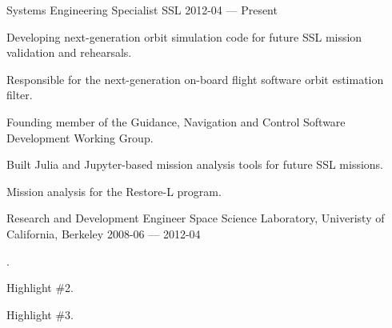 


\begin{cventries}

  \cventry
    {Systems Engineering Specialist} %
    {SSL} %
    {} %
    {2012-04 — Present} %
    {
      \begin{cvitems} %
        \item {Developing next-generation orbit simulation code for future SSL mission validation and rehearsals.}
        \item {Responsible for the next-generation on-board flight software orbit estimation filter.}
        \item {Founding member of the Guidance, Navigation and Control Software Development Working Group.}
        \item {Built Julia and Jupyter-based mission analysis tools for future SSL missions.}
        \item {Mission analysis for the Restore-L program.}
      \end{cvitems}
    }


  \cventry
    {Research and Development Engineer} %
    {Space Science Laboratory, Univeristy of California, Berkeley} %
    {} %
    {2008-06 — 2012-04} %
    {
      \begin{cvitems} %
        \item {.}
        \item {Highlight \#2.}
        \item {Highlight \#3.}
      \end{cvitems}
    }


\end{cventries}

